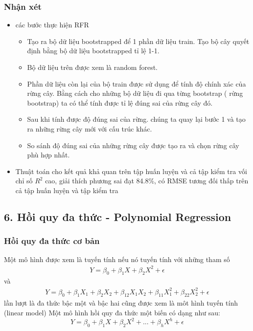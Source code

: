 \documentclass{article}
\begin{document}
	\subsubsection{Nhận xét}
	\begin{itemize}
		\item các bước thực hiện RFR
		\begin{itemize}
			\item Tạo ra bộ dữ liệu bootstrapped để 1 phần dữ liệu train. Tạo bộ cây quyết định bằng bộ dữ liệu bootstrapped tỉ lệ 1-1.
			\item Bộ dữ liệu trên được xem là random forest.
			\item Phần dữ liệu còn lại của bộ train được sử dụng để tính độ chính xác của rừng cây. Bằng cách cho những bộ dữ liệu đi qua từng bootstrap ( rừng bootstrap) ta có thể tính được tỉ lệ đúng sai của rừng cây đó.
			\item Sau khi tính được độ đúng sai của rừng. chúng ta quay lại bước 1 và tạo ra những rừng cây mới với cấu trúc khác.
			\item So sánh độ đúng sai của những rừng cây được tạo ra và chọn rừng cây phù hợp nhất.
		\end{itemize}
		\item Thuật toán cho kết quả khả quan trên tập huấn luyện và cả tập kiểm tra vối chỉ số $R^2$ cao, giải thích phương sai đạt 84.8\%, có RMSE tương đối thấp trên cả tập huấn luyện và tập kiểm tra		
	\end{itemize}
	\subsection{6. Hồi quy đa thức - Polynomial Regression}
	\subsubsection{Hồi quy đa thức cơ bản}
	\qquad Một mô hình được xem là tuyến tính nếu nó tuyến tính với những tham số
	\begin{align*}
		Y = \beta_0 + \beta_1X + \beta_2X^2 + \epsilon
	\end{align*}
	và 
	\begin{align*}
	Y = \beta_0 + \beta_1X_1 + \beta_2X_2 +  \beta_12X_1X_2 + \beta_{11}X_1^2 + \beta_{22}X_2^2 + \epsilon
	\end{align*}
	lần lượt là đa thức bậc một và bậc hai cũng được xem là môt hình tuyến tính (linear model)
	Một mô hình hồi quy đa thức một biến có dạng như sau:
	$$Y = \beta_0 + \beta_1X + \beta_2X^2 + ... + \beta_hX^h + \epsilon$$
	
\end{document}
